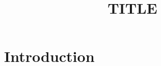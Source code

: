 \documentclass[10pt,a4paper]{amsart}
\begin{document}
\title{{{TITLE}}}
\author{}
\date{}
\maketitle
\section{Introduction}\label{sec:intro}
\end{document}
